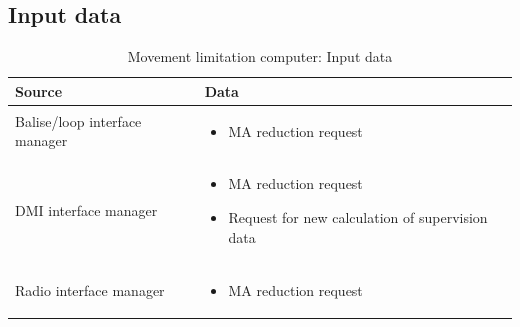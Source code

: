 \documentclass[nocc]{template/openetcs_report}
\begin{document}
\subsection{Input data}
			\begin{longtable}{|l|l|}
				\caption{Movement limitation computer: Input data}\\ 
				\hline
				
					\begin{minipage}[t]{0.35\linewidth} \textbf{Source}	\end{minipage} 
				&	\begin{minipage}[t]{0.65\linewidth} \textbf{Data} \end{minipage} \\
				
				\hline
																																									
					\begin{minipage}[t]{0.35\linewidth} Balise/loop interface manager	\end{minipage} 
				&	\begin{minipage}[t]{0.65\linewidth}
						\begin{itemize}
							\item MA reduction request
						\end{itemize}
					\end{minipage} \\
				
				\hline
				
					\begin{minipage}[t]{0.35\linewidth} DMI interface manager	\end{minipage} 
				&	\begin{minipage}[t]{0.65\linewidth}
						\begin{itemize}
							\item MA reduction request 
							\item Request for new calculation of supervision data
						\end{itemize}			
					\end{minipage} \\
				
				\hline
				
					\begin{minipage}[t]{0.35\linewidth} Radio interface manager	\end{minipage} 
				&	\begin{minipage}[t]{0.65\linewidth}
						\begin{itemize}
							\item MA reduction request
						\end{itemize}			
					\end{minipage} \\
				

\end{longtable}
\end{document}
